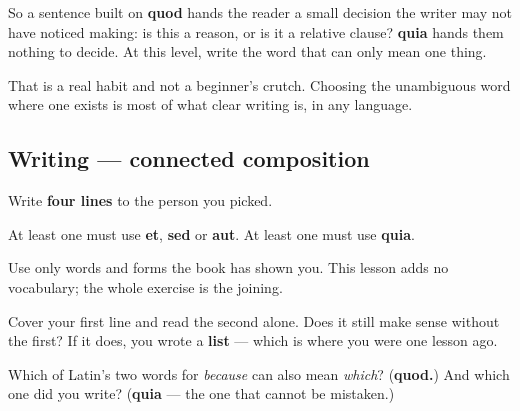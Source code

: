 So a sentence built on \textbf{quod} hands the reader a small decision the writer may not have noticed making: is this a reason, or is it a relative clause? \textbf{quia} hands them nothing to decide. At this level, write the word that can only mean one thing.

That is a real habit and not a beginner's crutch. Choosing the unambiguous word where one exists is most of what clear writing is, in any language.

\subsection*{Writing — connected composition}
Write \textbf{four lines} to the person you picked.

At least one must use \textbf{et}, \textbf{sed} or \textbf{aut}. At least one must use \textbf{quia}.

Use only words and forms the book has shown you. This lesson adds no vocabulary; the whole exercise is the joining.

\begin{tcolorbox}[breakable,colback=teal!4,colframe=teal!35!black,title={Before you move on}]
Cover your first line and read the second alone. Does it still make sense without the first? If it does, you wrote a \textbf{list} — which is where you were one lesson ago.

Which of Latin's two words for \emph{because} can also mean \emph{which}? (\textbf{quod.}) And which one did you write? (\textbf{quia} — the one that cannot be mistaken.)
\end{tcolorbox}

